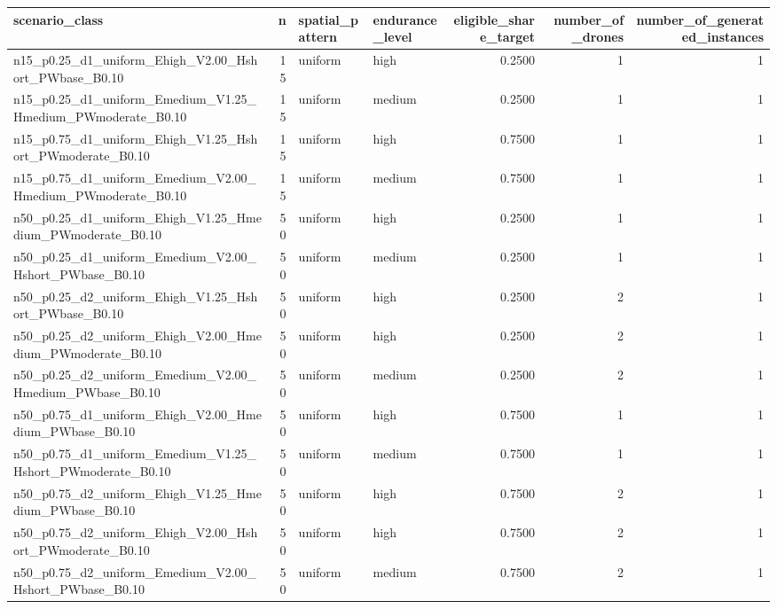 \begin{tabular}{lrllrrr}
\toprule
scenario_class & n & spatial_pattern & endurance_level & eligible_share_target & number_of_drones & number_of_generated_instances \\
\midrule
n15_p0.25_d1_uniform_Ehigh_V2.00_Hshort_PWbase_B0.10 & 15 & uniform & high & 0.2500 & 1 & 1 \\
n15_p0.25_d1_uniform_Emedium_V1.25_Hmedium_PWmoderate_B0.10 & 15 & uniform & medium & 0.2500 & 1 & 1 \\
n15_p0.75_d1_uniform_Ehigh_V1.25_Hshort_PWmoderate_B0.10 & 15 & uniform & high & 0.7500 & 1 & 1 \\
n15_p0.75_d1_uniform_Emedium_V2.00_Hmedium_PWmoderate_B0.10 & 15 & uniform & medium & 0.7500 & 1 & 1 \\
n50_p0.25_d1_uniform_Ehigh_V1.25_Hmedium_PWmoderate_B0.10 & 50 & uniform & high & 0.2500 & 1 & 1 \\
n50_p0.25_d1_uniform_Emedium_V2.00_Hshort_PWbase_B0.10 & 50 & uniform & medium & 0.2500 & 1 & 1 \\
n50_p0.25_d2_uniform_Ehigh_V1.25_Hshort_PWbase_B0.10 & 50 & uniform & high & 0.2500 & 2 & 1 \\
n50_p0.25_d2_uniform_Ehigh_V2.00_Hmedium_PWmoderate_B0.10 & 50 & uniform & high & 0.2500 & 2 & 1 \\
n50_p0.25_d2_uniform_Emedium_V2.00_Hmedium_PWbase_B0.10 & 50 & uniform & medium & 0.2500 & 2 & 1 \\
n50_p0.75_d1_uniform_Ehigh_V2.00_Hmedium_PWbase_B0.10 & 50 & uniform & high & 0.7500 & 1 & 1 \\
n50_p0.75_d1_uniform_Emedium_V1.25_Hshort_PWmoderate_B0.10 & 50 & uniform & medium & 0.7500 & 1 & 1 \\
n50_p0.75_d2_uniform_Ehigh_V1.25_Hmedium_PWbase_B0.10 & 50 & uniform & high & 0.7500 & 2 & 1 \\
n50_p0.75_d2_uniform_Ehigh_V2.00_Hshort_PWmoderate_B0.10 & 50 & uniform & high & 0.7500 & 2 & 1 \\
n50_p0.75_d2_uniform_Emedium_V2.00_Hshort_PWbase_B0.10 & 50 & uniform & medium & 0.7500 & 2 & 1 \\
\bottomrule
\end{tabular}
